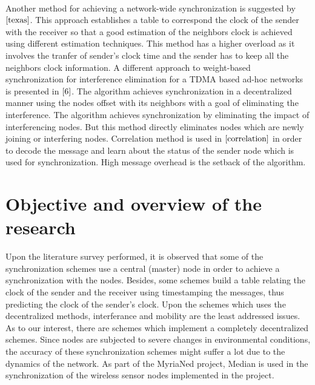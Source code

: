 \documentclass[a4paper,10pt]{report}
\begin{document}
\paragraph*{} Another method for achieving a network-wide synchronization is suggested by $\cite{texas}$. This approach establishes a table to correspond the clock of the sender with the receiver so that a good estimation of the neighbors clock is achieved using different estimation techniques. This method has a higher overload as it involves the tranfer of sender's clock time and the sender has to keep all the neighbors clock information.
 A different  approach to weight-based synchronization for interference elimination for a TDMA based ad-hoc networks is presented in
$\cite{6}$. The algorithm achieves synchronization in a decentralized manner using the nodes offset with its neighbors with a goal of eliminating the interference. The algorithm achieves synchronization by eliminating the impact of interferencing nodes. But this method directly eliminates nodes which are newly joining or interfering nodes. Correlation method is used in $\cite{correlation}$ in order to decode the message and learn about the status of the sender node which is used for synchronization. High message overhead is the setback of the algorithm.
\section{\textbf{Objective and overview of the research}}
Upon the literature survey performed, it is observed that some of the synchronization schemes use a central (master) node in order to
achieve a synchronization with the nodes.  Besides, some schemes build a table relating the clock of the sender and the receiver using timestamping the messages, thus predicting the clock of the sender's clock. Upon the schemes which uses the decentralized methods, interferance and mobility are the least addressed issues. As to our interest, there are schemes which implement a completely decentralized schemes. Since nodes are subjected to severe changes in environmental conditions, the accuracy of these synchronization schemes might suffer a lot due to the dynamics of the network. As part of the MyriaNed project, Median is used in the synchronization of the wireless sensor nodes implemented in the project.
\end{document}
